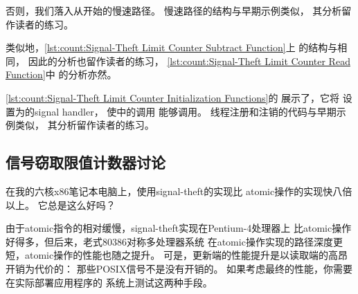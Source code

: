 \begin{listing}

\caption{Signal-Theft Limit Counter读取函数}
\label{lst:count:Signal-Theft Limit Counter Read Function}
\end{listing}

\begin{fcvref}
否则，我们落入从开始的慢速路径。
慢速路径的结构与早期示例类似，
其分析留作读者的练习。
\end{fcvref}
类似地，\cref{lst:count:Signal-Theft Limit Counter Subtract Function}上
的结构与相同，
因此的分析也留作读者的练习，
\cref{lst:count:Signal-Theft Limit Counter Read Function}中
的分析亦然。

\begin{listing}

\caption{Signal-Theft Limit Counter初始化函数}
\label{lst:count:Signal-Theft Limit Counter Initialization Functions}
\end{listing}

\begin{fcvref}
\cref{lst:count:Signal-Theft Limit Counter Initialization Functions}的
展示了，它将
设置为的signal handler，
使中的调用
能够调用。
线程注册和注销的代码与早期示例类似，
其分析留作读者的练习。
\end{fcvref}

\subsection{信号窃取限值计数器讨论}

在我的六核x86笔记本电脑上，使用signal-theft的实现比
atomic操作的实现快八倍以上。
它总是这么好吗？

由于atomic指令的相对缓慢，signal-theft实现在Pentium-4处理器上
比atomic操作好得多，但后来，老式80386对称多处理器系统
在atomic操作实现的路径深度更短，atomic操作的性能也随之提升。
可是，更新端的性能提升是以读取端的高昂开销为代价的：
那些POSIX信号不是没有开销的。
如果考虑最终的性能，你需要在实际部署应用程序的
系统上测试这两种手段。

\QuickQuizEnd

